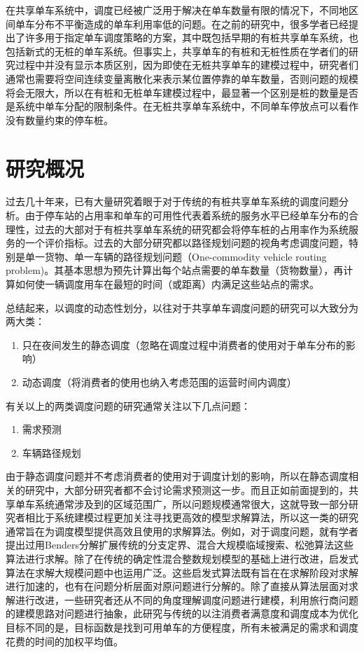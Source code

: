\documentclass[]{tongjithesis}
\numberwithin{equation}{chapter}
\begin{document}
在共享单车系统中，调度已经被广泛用于解决在单车数量有限的情况下，不同地区间单车分布不平衡造成的单车利用率低的问题。在之前的研究中，很多学者已经提出了许多用于指定单车调度策略的方案，其中既包括早期的有桩共享单车系统，也包括新式的无桩的单车系统。但事实上，共享单车的有桩和无桩性质在学者们的研究过程中并没有显示本质区别，因为即使在无桩共享单车的建模过程中，研究者们通常也需要将空间连续变量离散化来表示某位置停靠的单车数量，否则问题的规模将会无限大，所以在有桩和无桩单车建模过程中，最显著一个区别是桩的数量是否是系统中单车分配的限制条件。在无桩共享单车系统中，不同单车停放点可以看作没有数量约束的停车桩。

\section{研究概况}
过去几十年来，已有大量研究着眼于对于传统的有桩共享单车系统的调度问题分析。由于停车站的占用率和单车的可用性代表着系统的服务水平已经单车分布的合理性，过去的大部对于有桩共享单车系统的研究都会将停车桩的占用率作为系统服务的一个评价指标。过去的大部分研究都以路径规划问题的视角考虑调度问题，特别是单一货物、单一车辆的路径规划问题（One-commodity vehicle routing problem)。其基本思想为预先计算出每个站点需要的单车数量（货物数量），再计算如何使一辆调度用车在最短的时间（或距离）内满足这些站点的需求。

总结起来，以调度的动态性划分，以往对于共享单车调度问题的研究可以大致分为两大类：\par
\begin{enumerate}
	\item 只在夜间发生的静态调度（忽略在调度过程中消费者的使用对于单车分布的影响）
	\item 动态调度（将消费者的使用也纳入考虑范围的运营时间内调度）
\end{enumerate}

有关以上的两类调度问题的研究通常关注以下几点问题：
\begin{enumerate}
	\item 需求预测
	\item 车辆路径规划
\end{enumerate}

由于静态调度问题并不考虑消费者的使用对于调度计划的影响，所以在静态调度相关的研究中，大部分研究者都不会讨论需求预测这一步。而且正如前面提到的，共享单车系统通常涉及到的区域范围广，所以问题规模通常很大，这就导致一部分研究者相比于系统建模过程更加关注寻找更高效的模型求解算法，所以这一类的研究通常旨在为调度模型提供高效且使用的求解算法。例如，对于调度问题，就有学者提出过用Benders分解扩展传统的分支定界\cite{erdougan2015exact}、混合大规模临域搜索\cite{pal2017free}、松弛算法\cite{chemla2013bike}这些算法进行求解。除了在传统的确定性混合整数规划模型的基础上进行改进，启发式算法在求解大规模问题中也运用广泛\cite{ho2014solving,forma20153}。这些启发式算法既有旨在在求解阶段对求解进行加速的，也有在问题分析层面对原问题进行分解的。除了直接从算法层面对求解进行改进，一些研究者还从不同的角度理解调度问题进行建模，利用旅行商问题的建模思路对问题进行抽象\cite{chemla2013bike}，此研究与传统的以注消费者满意度和调度成本为优化目标不同的是，目标函数是找到可用单车的方便程度，所有未被满足的需求和调度花费的时间的加权平均值。
\end{document}

